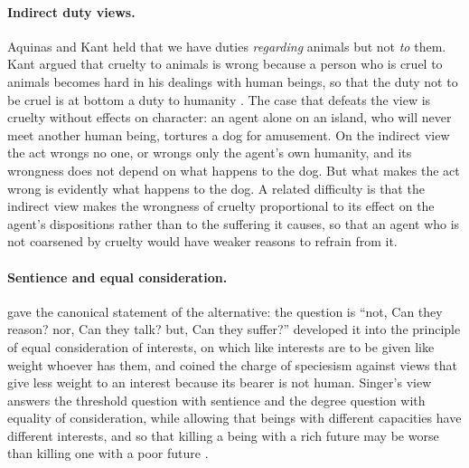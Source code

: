 \documentclass{situationist-preprint}
\begin{document}
\paragraph{Indirect duty views.} Aquinas and Kant held that we have duties \emph{regarding} animals but not \emph{to} them. Kant argued that cruelty to animals is wrong because a person who is cruel to animals becomes hard in his dealings with human beings, so that the duty not to be cruel is at bottom a duty to humanity \citep{KantLectures}. The case that defeats the view is cruelty without effects on character: an agent alone on an island, who will never meet another human being, tortures a dog for amusement. On the indirect view the act wrongs no one, or wrongs only the agent's own humanity, and its wrongness does not depend on what happens to the dog. But what makes the act wrong is evidently what happens to the dog. A related difficulty is that the indirect view makes the wrongness of cruelty proportional to its effect on the agent's dispositions rather than to the suffering it causes, so that an agent who is not coarsened by cruelty would have weaker reasons to refrain from it.

\paragraph{Sentience and equal consideration.} \citet[ch.~XVII]{Bentham1789} gave the canonical statement of the alternative: the question is \enquote{not, Can they reason? nor, Can they talk? but, Can they suffer?} \citet{Singer1975} developed it into the principle of equal consideration of interests, on which like interests are to be given like weight whoever has them, and coined the charge of speciesism against views that give less weight to an interest because its bearer is not human. Singer's view answers the threshold question with sentience and the degree question with equality of consideration, while allowing that beings with different capacities have different interests, and so that killing a being with a rich future may be worse than killing one with a poor future \citep{Singer1993}.
\end{document}
